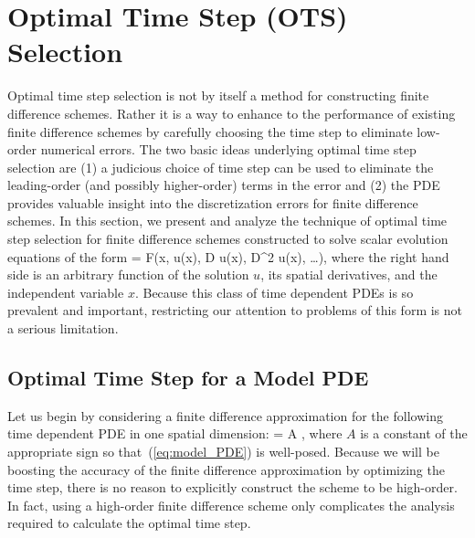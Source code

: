 \documentclass[fleqn,12pt,twoside]{article}
\begin{document}
\section{\label{sec:optimal_time_step_selection} 
         Optimal Time Step (OTS) Selection}
Optimal time step selection is not by itself a method for constructing 
finite difference schemes.  Rather it is a way to enhance to the performance
of existing finite difference schemes by carefully choosing the time step to 
eliminate low-order numerical errors.  The two basic ideas underlying 
optimal time step selection are 
(1) a judicious choice of time step can be used to eliminate the leading-order 
(and possibly higher-order) terms in the error
and
(2) the PDE provides valuable insight into the discretization errors for 
finite difference schemes.
In this section, we present and analyze the technique of optimal time step 
selection for finite difference schemes constructed to solve scalar evolution 
equations of the form 
\beq
   = 
    F\left(x, u(x), D u(x), D^2 u(x), \ldots \right), 
\eeq
where the right hand side is an arbitrary function of the solution $u$, its 
spatial derivatives, and the independent variable $x$.
Because this class of time dependent PDEs is so prevalent and important, 
restricting our attention to problems of this form is not a serious 
limitation.  


\subsection{\label{sec:ots_model_pde} 
            Optimal Time Step for a Model PDE}
Let us begin by considering a finite difference approximation for the
following time dependent PDE in one spatial dimension: 
\beq
   = A ,
  \label{eq:model_PDE}
\eeq
where $A$ is a constant of the appropriate sign so that~(\ref{eq:model_PDE}) 
is well-posed.  Because we will be boosting the accuracy of the finite 
difference approximation by optimizing the time step, there is no reason to 
explicitly construct the scheme to be high-order.  In fact, using a high-order 
finite difference scheme only complicates the analysis required to calculate 
the optimal time step.  
\end{document}

